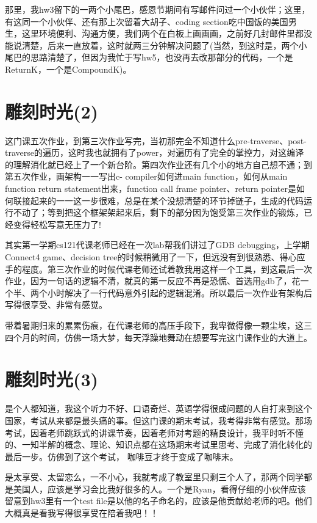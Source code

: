 \documentclass[12pt]{book}
\begin{document}
那里，我hw3留下的一两个小尾巴，感恩节期间有写邮件问过一个小伙伴；这里，有这同一个小伙伴、还有那上次留着大胡子、coding section吃中国饭的美国男生，这里环境便利、沟通方便，我们两个在白板上画画画，之前好几封邮件里都没能说清楚，后来一直放着，这时就两三分钟解决问题了(当然，到这时是，两个小尾巴的思路清楚了，但因为我忙于写hw5，也没再去改那部分的代码，一个是ReturnK，一个是CompoundK)。

\section{雕刻时光(2)}
\label{sec-6-2}

这门课五次作业，到第三次作业写完，当初那完全不知道什么pre-traverse、post-traverse的遍历，这时我也就拥有了power，对遍历有了完全的掌控力，对这编译的理解消化就已经上了一个新台阶。第四次作业还有几个小的地方自己想不通；到第五次作业，画架构一一写出c- compiler如何进main function，如何从main function return statement出来，function call frame pointer、return pointer是如何联接起来的一一这一步很难，总是在某个没想清楚的环节掉链子，生成的代码运行不动了；等到把这个框架架起来后，剩下的部分因为饱受第三次作业的锻炼，已经变得轻松写意无压力了!

其实第一学期cs121代课老师已经在一次lab帮我们讲过了GDB debugging，上学期Connect4 game、decision tree的时候稍微用了一下，但远没有到很熟悉、得心应手的程度。第三次作业的时候代课老师还试着教我用这样一个工具，到这最后一次作业，因为一句话的逻辑不清，就真的第一反应不再是恐慌、首选用gdb了，花一个半、两个小时解决了一行代码意外引起的逻辑混淆。所以最后一次作业有架构后写得很享受、非常有感觉。

带着暑期归来的累累伤痕，在代课老师的高压手段下，我卑微得像一颗尘埃，这三四个月的时间，仿佛一场大梦，每天浮躁地舞动在想要写完这门课作业的大道上。

\section{雕刻时光(3)}
\label{sec-6-3}

是个人都知道，我这个听力不好、口语奇烂、英语学得很成问题的人自打来到这个国家，考试从来都是最头痛的事。但这门课的期末考试，我考得非常有感觉。那场考试，因着老师跳跃式的讲课节奏，因着老师对考题的精良设计，我平时听不懂的、一知半解的概念、理论、知识点都在这场期末考试里思考、完成了消化转化的最后一步。仿佛到了这个考试，
咖啡豆才终于变成了咖啡末。

是太享受、太留恋么，一不小心，我就考成了教室里只剩三个人了，那两个同学都是美国人，应该是学习会比我好很多的人。一个是Ryan，看得仔细的小伙伴应该留意到hw3里有一个test file是以他的名子命名的，应该是他贡献给老师的吧。他们大概真是看我写得很享受在陪着我吧！！
\end{document}
